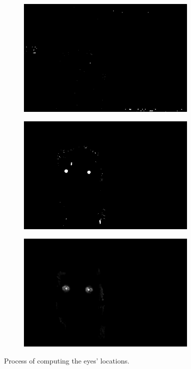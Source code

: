 \begin{figure}[H]
\begin{subfigure}{.33\textwidth}
  \centering
  \includegraphics[width=0.95\textwidth]{img/fd/OverSaturatedMask.png}
  \caption{}
\end{subfigure}%
\begin{subfigure}{.33\textwidth}
  \centering
  \includegraphics[width=0.95\textwidth]{img/fd/FilteredFaceMaskEyesReal.png}
  \caption{}
\end{subfigure}%
\begin{subfigure}{.33\textwidth}
  \centering
  \includegraphics[width=0.95\textwidth]{img/fd/EyeMap2.png}
  \caption{}
\end{subfigure}%

\caption{Process of computing the eyes' locations.}
\label{fig:eyeMap}
\end{figure}



